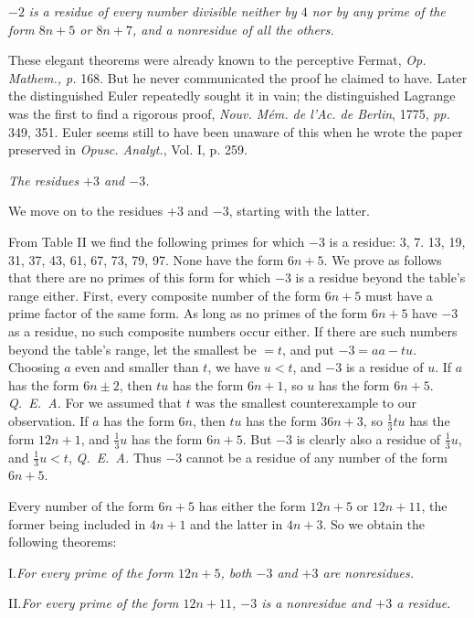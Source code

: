 $-2$ \emph{is a residue of every number divisible neither by $4$ nor by any prime of the form $8n+5$ or $8n+7$, and a nonresidue of all the others.}

These elegant theorems were already known to the perceptive Fermat, \emph{Op. Mathem., p.} 168. But he never communicated the proof he claimed to have. Later the distinguished Euler repeatedly sought it in vain; the distinguished Lagrange was the first to find a rigorous proof, \emph{Nouv. M\'em. de l'Ac. de Berlin}, 1775, \emph{pp.} 349, 351. Euler seems still to have been unaware of this when he wrote the paper preserved in \emph{Opusc. Analyt.}, Vol. I, p. 259.

\begin{center}\emph{The residues $+3$ and $-3$.}\end{center}

We move on to the residues $+3$ and $-3$, starting with the latter.

From Table II we find the following primes for which $-3$ is a residue: 3, 7. 13, 19, 31, 37, 43, 61, 67, 73, 79, 97. None have the form $6n+5$. We prove as follows that there are no primes of this form for which $-3$ is a residue beyond the table's range either. First, every composite number of the form $6n+5$ must have a prime factor of the same form. As long as no primes of the form $6n+5$ have $-3$ as a residue, no such composite numbers occur either. If there are such numbers beyond the table's range, let the smallest be $=t$, and put $-3=aa-tu$. Choosing $a$ even and smaller than $t$, we have $u<t$, and $-3$ is a residue of $u$. If $a$ has the form $6n\pm2$, then $tu$ has the form $6n+1$, so $u$ has the form $6n+5$. \mbox{\emph{Q. E. A.}} For we assumed that $t$ was the smallest counterexample to our observation. If $a$ has the form $6n$, then $tu$ has the form $36n+3$, so $\frac{1}{3}tu$ has the form $12n+1$, and $\frac{1}{3}u$ has the form $6n+5$. But $-3$ is clearly also a residue of $\frac{1}{3}u$, and $\frac{1}{3}u<t$, \mbox{\emph{Q. E. A.}} Thus $-3$ cannot be a residue of any number of the form $6n+5$.

Every number of the form $6n+5$ has either the form $12n+5$ or $12n+11$, the former being included in $4n+1$ and the latter in $4n+3$. So we obtain the following theorems:

I.\quad \emph{For every prime of the form $12n+5$, both $-3$ and $+3$ are nonresidues.}

II.\quad \emph{For every prime of the form $12n+11$, $-3$ is a nonresidue and $+3$ a residue.}

